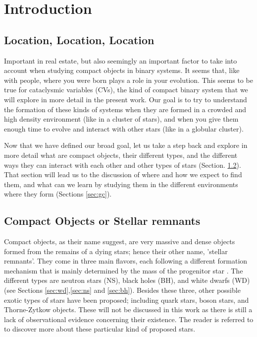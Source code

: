 \chapter{Introduction}
\thispagestyle{fancy}


\section{Location, Location, Location}

Important in real estate, but also seemingly an important factor to take into account when studying compact objects in binary systems. It seems that, like with people, where you were born plays a role in your evolution. This seems to be true for cataclysmic variables (CVs), the kind of compact binary system that we will explore in more detail in the present work. Our goal is to try to understand the formation of these kinds of systems when they are formed in a crowded and high density environment (like in a cluster of stars), and when you give them enough time to evolve and interact with other stars (like in a globular cluster).  

Now that we have defined our broad goal, let us take a step back and explore in more detail what are compact objects, their different types, and the different ways they can interact with each other and other types of stars (Section. \ref{sec:co}). That section will lead us to the discussion of where and how we expect to find them, and what can we learn by studying them in the different environments where they form (Sections \ref{sec:gc}).

\section{Compact Objects or Stellar remnants}\label{sec:co}

Compact objects, as their name suggest, are very massive and dense objects formed from the remains of a dying stars; hence their other name, 'stellar remnants'. They come in three main flavors, each following a different formation mechanism that is mainly determined by the mass of the progenitor star \citep{de2008stars}. The different types are neutron stars (NS), black holes (BH), and white dwarfs (WD) (see Sections \ref{sec:wd},\ref{sec:ns} and \ref{sec:bh}). Besides these three, other possible exotic types of stars have been proposed; including quark stars, boson stars, and Thorne-Zytkow objects. These will not be discussed in this work as there is still a lack of observational evidence concerning their existence. The reader is referred to \cite{cleymans_physics_1999} to discover more about these particular kind of proposed stars. 

